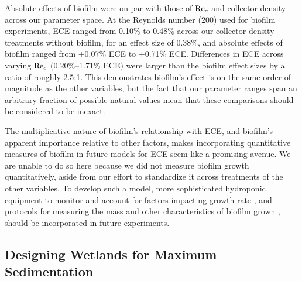 \documentclass[geosciences,article,submit,moreauthors,pdftex]{Definitions/mdpi}
\begin{document}
Absolute effects of biofilm were on par with those of $\mathrm{Re}_c$ and collector density across our parameter space. At the Reynolds number (200) used for biofilm experiments, ECE ranged from 0.10\% to 0.48\% across our collector-density treatments without biofilm, for an effect size of 0.38\%, and absolute effects of biofilm ranged from +0.07\% ECE to +0.71\% ECE. Differences in ECE across varying $\mathrm{Re}_c$ (0.20\%--1.71\% ECE) were larger than the biofilm effect sizes by a ratio of roughly 2.5:1. This demonstrates biofilm's effect is on the same order of magnitude as the other variables, but the fact that our parameter ranges span an arbitrary fraction of possible natural values mean that these comparisons should be considered to be inexact.

The multiplicative nature of biofilm's relationship with ECE, and biofilm's apparent importance relative to other factors, makes incorporating quantitative measures of biofilm in future models for ECE seem like a promising avenue. We are unable to do so here because we did not measure biofilm growth quantitatively, aside from our effort to standardize it across treatments of the other variables. To develop such a model, more sophisticated hydroponic equipment to monitor and account for factors impacting growth rate \cite{schnurr2014effect, trulear1982dynamics}, and protocols for measuring the mass and other characteristics of biofilm grown \cite{liu1994simple,characklis1982dynamics}, should be incorporated in future experiments.

\subsection{Designing Wetlands for Maximum Sedimentation}

\vspace{6pt} 



\end{document}

